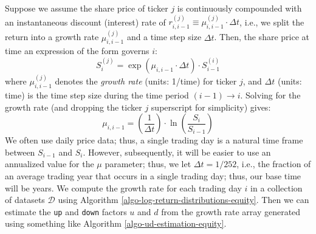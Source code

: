 \documentclass[11pt]{article}
\theoremstyle{definition}
\begin{document}
Suppose we assume the share price of ticker $j$ is continuously compounded with an instantaneous discount (interest) rate of 
$r^{(j)}_{i,i-1}\equiv\mu^{(j)}_{i,i-1}\cdot\Delta{t}$, i.e., we split the return into a growth rate $\mu^{(j)}_{i,i-1}$ and a time step size $\Delta{t}$.
Then, the share price at time an expression of the form governs $i$:
\begin{equation}\label{eqn:share-price-growth-rate}
S^{(j)}_{i} = \exp\left(\mu_{i,i-1}\cdot\Delta{t}\right)\cdot{S^{(i)}_{i-1}}
\end{equation}
where $\mu^{(j)}_{i,i-1}$ denotes the \textit{growth rate} (units: 1/time) for ticker $j$, and $\Delta{t}$ (units: time) 
is the time step size during the time period $(i-1)\rightarrow{i}$.
Solving for the growth rate (and dropping the ticker $j$ superscript for simplicity) gives:
\begin{equation}
\mu_{i,i-1} = \left(\frac{1}{\Delta{t}}\right)\cdot\ln\left(\frac{S_{i}}{S_{i-1}}\right)
\end{equation}
We often use daily price data; thus, a single trading day is a natural time frame between $S_{i-1}$ and $S_{i}$. 
However, subsequently, it will be easier to use an annualized value for the $\mu$ parameter; thus, we let $\Delta{t} = 1/252$, 
i.e., the fraction of an average trading year that occurs in a single trading day; thus, our base time will be years.
We compute the growth rate for each trading day $i$ in a collection of datasets $\mathcal{D}$ using Algorithm \ref{algo-log-return-distributions-equity}.
Then we can estimate the \texttt{up} and \texttt{down} factors $u$ and $d$ from the growth rate array 
generated using something like Algorithm \ref{algo-ud-estimation-equity}. 
\end{document}
